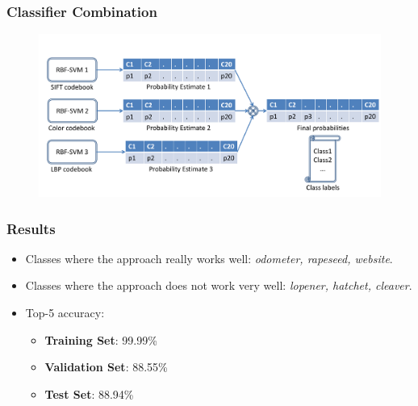 \documentclass{beamer}
\begin{document}
\begin{frame}
\frametitle{Classifier Combination}
\begin{figure}
\includegraphics[width = 1\textwidth]{classifiercombination}
\end{figure}
\end{frame}

\begin{frame}
\frametitle{Results}
\begin{itemize}
\item<1-3> Classes where the approach really works well: \textit{odometer, rapeseed, website}.
\item<2-3> Classes where the approach does not work very well: \textit{lopener, hatchet, cleaver}.
\item<3> Top-5 accuracy:
\begin{itemize}
\item \textbf{Training Set}: 99.99\%
\item \textbf{Validation Set}: 88.55\%
\item \textbf{Test Set}: 88.94\%
\end{itemize}
\end{itemize}
\end{frame}
\end{document}
